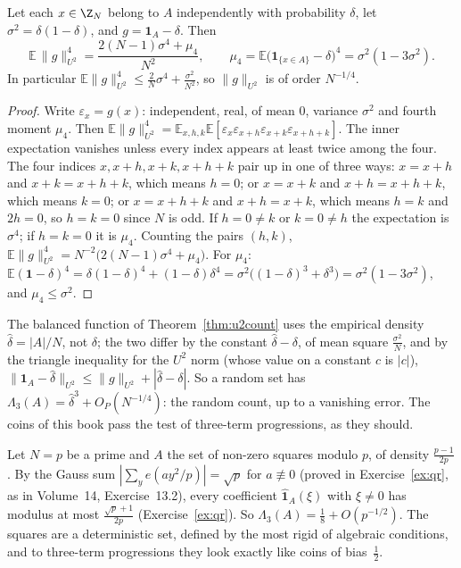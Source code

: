 \begin{proposition}\label{prop:randomu2}
Let each $x\in\Z_N$ belong to $A$ independently with probability $\delta$, let $\sigma^2=\delta(1-\delta)$, and $g=\mathbf 1_A-\delta$. Then
\[
\mathbb E\,\|g\|_{U^2}^4=\frac{2(N-1)\sigma^4+\mu_4}{N^2},\qquad\mu_4=\mathbb E\bigl(\mathbf 1_{\{x\in A\}}-\delta\bigr)^4=\sigma^2(1-3\sigma^2).
\]
In particular $\mathbb E\|g\|_{U^2}^4\le\frac2N\sigma^4+\frac{\sigma^2}{N^2}$, so $\|g\|_{U^2}$ is of order $N^{-1/4}$.
\end{proposition}
\begin{proof}
Write $\varepsilon_x=g(x)$: independent, real, of mean $0$, variance $\sigma^2$ and fourth moment $\mu_4$. Then $\mathbb E\|g\|_{U^2}^4=\mathbb E_{x,h,k}\mathbb E[\varepsilon_x\varepsilon_{x+h}\varepsilon_{x+k}\varepsilon_{x+h+k}]$. The inner expectation vanishes unless every index appears at least twice among the four. The four indices $x,x+h,x+k,x+h+k$ pair up in one of three ways: $x=x+h$ and $x+k=x+h+k$, which means $h=0$; or $x=x+k$ and $x+h=x+h+k$, which means $k=0$; or $x=x+h+k$ and $x+h=x+k$, which means $h=k$ and $2h=0$, so $h=k=0$ since $N$ is odd. If $h=0\ne k$ or $k=0\ne h$ the expectation is $\sigma^4$; if $h=k=0$ it is $\mu_4$. Counting the pairs $(h,k)$, $\mathbb E\|g\|_{U^2}^4=N^{-2}\bigl(2(N-1)\sigma^4+\mu_4\bigr)$. For $\mu_4$: $\mathbb E(\mathbf 1-\delta)^4=\delta(1-\delta)^4+(1-\delta)\delta^4=\sigma^2\bigl((1-\delta)^3+\delta^3\bigr)=\sigma^2(1-3\sigma^2)$, and $\mu_4\le\sigma^2$.
\end{proof}

The balanced function of Theorem~\ref{thm:u2count} uses the empirical density $\hat\delta=|A|/N$, not $\delta$; the two differ by the constant $\hat\delta-\delta$, of mean square $\frac{\sigma^2}N$, and by the triangle inequality for the $U^2$ norm (whose value on a constant $c$ is $|c|$), $\|\mathbf 1_A-\hat\delta\|_{U^2}\le\|g\|_{U^2}+|\hat\delta-\delta|$. So a random set has $\Lambda_3(A)=\hat\delta^3+O_P(N^{-1/4})$: the random count, up to a vanishing error. The coins of this book pass the test of three-term progressions, as they should.

\begin{examplex}
Let $N=p$ be a prime and $A$ the set of non-zero squares modulo $p$, of density $\frac{p-1}{2p}$. By the Gauss sum $|\sum_ye(ay^2/p)|=\sqrt p$ for $a\not\equiv0$ (proved in Exercise~\ref{ex:qr}, as in Volume~14, Exercise~13.2), every coefficient $\hat{\mathbf 1}_A(\xi)$ with $\xi\ne0$ has modulus at most $\frac{\sqrt p+1}{2p}$ (Exercise~\ref{ex:qr}). So $\Lambda_3(A)=\frac18+O(p^{-1/2})$. The squares are a deterministic set, defined by the most rigid of algebraic conditions, and to three-term progressions they look exactly like coins of bias~$\frac12$.
\end{examplex}

